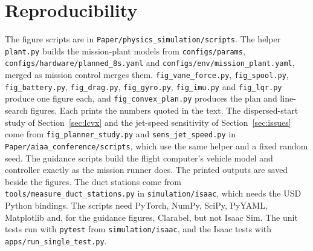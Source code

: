 \documentclass[journal]{IEEEtran}
\newcommand{\refsec}[1]{Section~\ref{#1}}
\begin{document}
\appendices
\section{Reproducibility}
\label{app:repro}

{\raggedright
The figure scripts are in \texttt{Paper/physics\_simulation/scripts}.
The helper \texttt{plant.py} builds the mission-plant models from \texttt{configs/params}, \texttt{configs/hardware/planned\_8s.yaml} and \texttt{configs/env/mission\_plant.yaml}, merged as mission control merges them.
\texttt{fig\_vane\_force.py}, \texttt{fig\_spool.py}, \texttt{fig\_battery.py}, \texttt{fig\_drag.py}, \texttt{fig\_gyro.py}, \texttt{fig\_imu.py} and \texttt{fig\_lqr.py} produce one figure each, and \texttt{fig\_convex\_plan.py} produces the plan and line-search figures.
Each prints the numbers quoted in the text.
The dispersed-start study of \refsec{sec:lcvx} and the jet-speed sensitivity of \refsec{sec:issues} come from \texttt{fig\_planner\_study.py} and \texttt{sens\_jet\_speed.py} in \texttt{Paper/aiaa\_conference/scripts}, which use the same helper and a fixed random seed.
The guidance scripts build the flight computer's vehicle model and controller exactly as the mission runner does.
The printed outputs are saved beside the figures.
The duct stations come from \texttt{tools/measure\_duct\_stations.py} in \texttt{simulation/isaac}, which needs the USD Python bindings.
The scripts need PyTorch, NumPy, SciPy, PyYAML, Matplotlib and, for the guidance figures, Clarabel, but not Isaac Sim.
The unit tests run with \texttt{pytest} from \texttt{simulation/isaac}, and the Isaac tests with \texttt{apps/run\_single\_test.py}.
\par}
\end{document}
